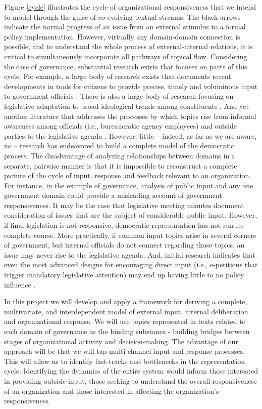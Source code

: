 Figure \ref{cycle} illustrates the cycle of organizational responsiveness that we intend to model through the guise of co-evolving textual streams. The black arrows indicate the normal progress of an issue from an external stimulus to a formal policy implementation. However, virtually any domain-domain connection is possible, and to understand the whole process of external-internal relations, it is critical to simultaneously incorporate all pathways of topical flow. Considering the case of governance, substantial research exists that focuses on parts of this cycle. For example, a large body of research exists that documents recent developments in tools for citizens to provide precise, timely and voluminous input to government officials  \cite{Tatkeiho2002,Andersen2006,Yildiz2007}. There is also a large body of research focusing on legislative adaptation to broad ideological trends among constituents \cite{MIller1963,Canes-Wrone2002,Levendusky2008}.  And yet another literature that addresses the processes by which topics rise from informal awareness among officials (i.e., bureaucratic agency employees) and outside parties to the legislative agenda \cite{Baumgartner1993,Wood1991,Furlong1998}. However, little -- indeed, as far as we are aware, no -- research has endeavored to build a complete model of the democratic process. The disadvantage of analyzing relationships between domains in a separate, pairwise manner is that it is impossible to reconstruct a complete picture of the cycle of input, response and feedback relevant to an organization.  For instance, in the example of governance, analysis of public input and any one government domain could provide a misleading account of government responsiveness. It may be the case that legislative meeting minutes document consideration of issues that are the subject of considerable public input. However, if final legislation is not responsive, democratic representation has not run its complete course. More practically, if common input topics arise in several corners of government, but internal officials do not connect regarding those topics, an issue may never rise to the legislative agenda. And, initial research indicates that even the most advanced designs for encouraging direct input (i.e., e-petitions that trigger mandatory legislative attention) may end up having little to no policy influence \cite{Hough2012}.

In this project we will develop and apply a framework for deriving a complete, multivariate, and interdependent model of external input, internal deliberation and organizational response.  We will use topics represented in texts related to each domain of governance as the binding substance - building bridges between stages of organizational activity and decision-making. The advantage of our approach will be that we will tap multi-channel input and response processes. This will allow us to identify fast-tracks and bottlenecks in the representation cycle. Identifying the dynamics of the entire system would inform those interested in providing outside input, those seeking to understand the overall responsiveness of an organization and those interested in affecting the organization's responsiveness.



